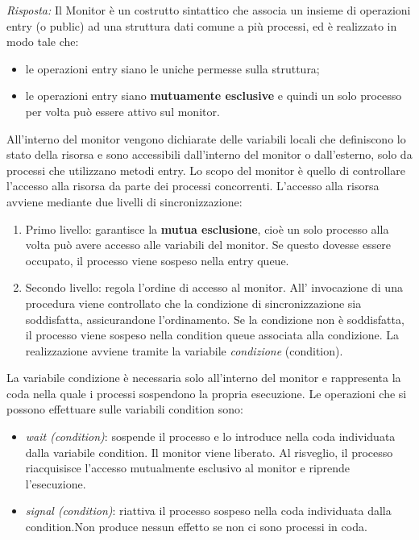 \documentclass{article}
\newenvironment{solution}
    {\textit{Risposta:}}
    {}
\begin{document}
\begin{solution}
Il Monitor è un costrutto sintattico che associa un insieme di operazioni entry (o public) ad una struttura dati comune a più processi, ed è realizzato in modo tale che:
\begin{itemize}
    \item le operazioni entry siano le uniche permesse sulla struttura;
    \item le operazioni entry siano \textbf{mutuamente esclusive} e quindi un solo processo per volta può essere attivo sul monitor.
\end{itemize}
All’interno del monitor vengono dichiarate delle variabili locali che definiscono lo stato della risorsa e sono accessibili dall’interno del monitor o dall’esterno, solo da processi che utilizzano metodi entry.
\newline
Lo scopo del monitor è quello di controllare l’accesso alla risorsa da parte dei processi concorrenti.
\newline
\newline
L’accesso alla risorsa avviene mediante due livelli di sincronizzazione:
\begin{enumerate}
    \item Primo livello: garantisce la \textbf{mutua esclusione}, cioè un solo processo alla volta può avere accesso alle variabili del monitor. Se questo dovesse essere occupato, il processo viene sospeso nella entry queue.
    \item Secondo livello: regola l’ordine di accesso al monitor. All' invocazione di una procedura viene controllato che la condizione di sincronizzazione sia soddisfatta, assicurandone l’ordinamento.
    \newline
    Se la condizione non è soddisfatta, il processo viene sospeso nella condition queue associata alla condizione.
    \newline
    La realizzazione avviene tramite la variabile \textit{condizione} (condition).
\end{enumerate}
La variabile condizione è necessaria solo all’interno del monitor e rappresenta la coda nella quale i processi sospendono la propria esecuzione.
\newline
Le operazioni che si possono effettuare sulle variabili condition sono:
\begin{itemize}
    \item \emph{wait (condition)}: sospende il processo e lo introduce nella coda individuata dalla variabile condition. Il monitor viene liberato. Al risveglio, il processo riacquisisce l’accesso mutualmente esclusivo al monitor e riprende l’esecuzione.
    \item \emph{signal (condition)}: riattiva il processo sospeso nella coda individuata dalla condition.\newline Non produce nessun effetto se non ci sono processi in coda.
\end{itemize}
\end{solution}
\end{document}
